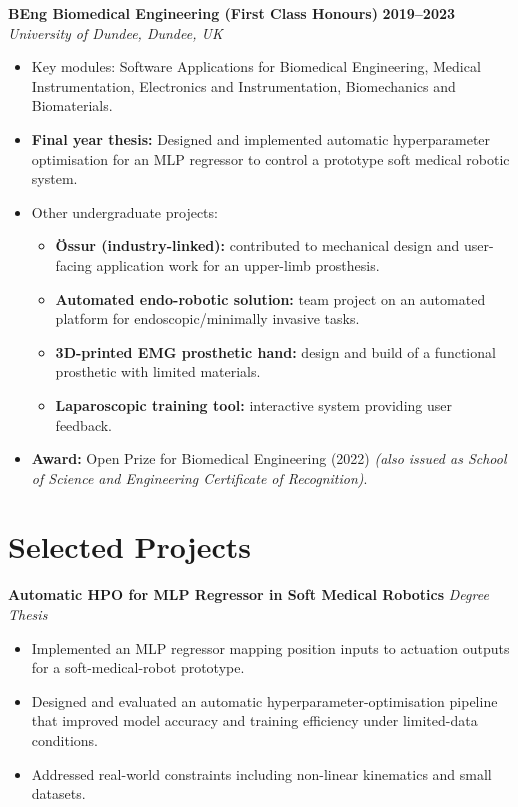 \documentclass[a4paper,11pt]{article}
\begin{document}
\textbf{BEng Biomedical Engineering (First Class Honours)} \hfill \textbf{2019--2023}\\
\textit{University of Dundee, Dundee, UK}
\begin{itemize}
    \item Key modules: Software Applications for Biomedical Engineering, Medical Instrumentation, Electronics and Instrumentation, Biomechanics and Biomaterials.
    \item \textbf{Final year thesis:} Designed and implemented automatic hyperparameter optimisation for an MLP regressor to control a prototype soft medical robotic system.
    \item Other undergraduate projects:
    \begin{itemize}
        \item \textbf{Össur (industry-linked):} contributed to mechanical design and user-facing application work for an upper-limb prosthesis.
        \item \textbf{Automated endo-robotic solution:} team project on an automated platform for endoscopic/minimally invasive tasks.
        \item \textbf{3D-printed EMG prosthetic hand:} design and build of a functional prosthetic with limited materials.
        \item \textbf{Laparoscopic training tool:} interactive system providing user feedback.
    \end{itemize}
    \item \textbf{Award:} Open Prize for Biomedical Engineering (2022) \emph{(also issued as School of Science and Engineering Certificate of Recognition)}.
\end{itemize}


\section*{Selected Projects}

\textbf{Automatic HPO for MLP Regressor in Soft Medical Robotics} \hfill \textit{Degree Thesis}
\begin{itemize}
    \item Implemented an MLP regressor mapping position inputs to actuation outputs for a soft-medical-robot prototype.
    \item Designed and evaluated an automatic hyperparameter-optimisation pipeline that improved model accuracy and training efficiency under limited-data conditions.
    \item Addressed real-world constraints including non-linear kinematics and small datasets.
\end{itemize}
\end{document}
